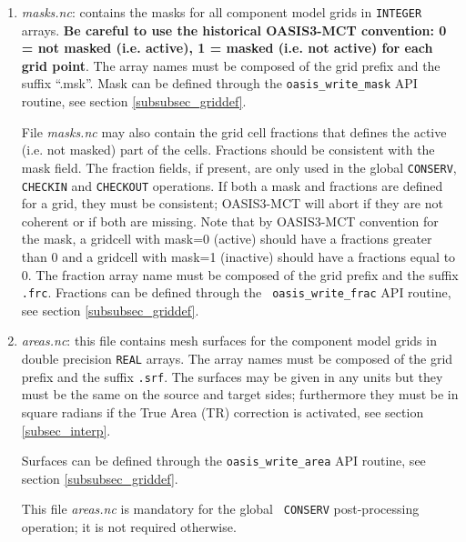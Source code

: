 \begin{enumerate}
  Cells larger than 180.0 degrees in longitude are not supported.
  
  Longitudes and latitudes of grid points or corners can be defined through the {\tt oasis\_write\_grid} or {\tt oasis\_write\_corner} API routines respectively,  see section \ref{subsubsec_griddef}.
 
\item {\em masks.nc}: contains the masks for all component model grids
  in {\tt INTEGER} arrays. {\bf Be careful to use the historical
    OASIS3-MCT convention: 0 = not masked (i.e. active), 1 = masked
    (i.e. not active) for each grid point}. The array names must be
  composed of the grid prefix and the suffix ``.msk''. Mask can be defined through the {\tt oasis\_write\_mask} API routine, see section \ref{subsubsec_griddef}.
  
 File {\em masks.nc} may also contain the grid cell fractions that
 defines the active (i.e. not masked) part of the cells.  Fractions
 should be consistent with the mask field. The fraction fields, if present, are only
 used in the global {\tt CONSERV}, {\tt CHECKIN} and {\tt CHECKOUT} operations. If both a
 mask and fractions are defined for a grid, they must be consistent;
 OASIS3-MCT will abort if they are not coherent or if both are
 missing.  Note that by OASIS3-MCT convention for the mask, a gridcell
 with mask=0 (active) should have a fractions greater than 0 and a
 gridcell with mask=1 (inactive) should have a fractions equal to 0.
 The fraction array name must be composed of the grid prefix and the
 suffix {\tt .frc}. Fractions can be defined through the {\tt
   oasis\_write\_frac} API routine, see section
 \ref{subsubsec_griddef}.
 
  
\item {\em areas.nc}: this file contains mesh surfaces for the
  component model grids in double precision {\tt REAL} arrays. The
  array names must be composed of the grid prefix and the suffix
  {\tt .srf}.  The surfaces may be given in any units but they must be
  the same on the source and target sides; furthermore they must be in square radians if the True Area (TR) correction is activated, see section \ref{subsec_interp}.

  Surfaces can be defined through the {\tt oasis\_write\_area} API routine, see section \ref{subsubsec_griddef}.
  
  This file {\em areas.nc} is mandatory for the global {\tt
    CONSERV} post-processing operation;
  it is not required otherwise.

\end{enumerate}

